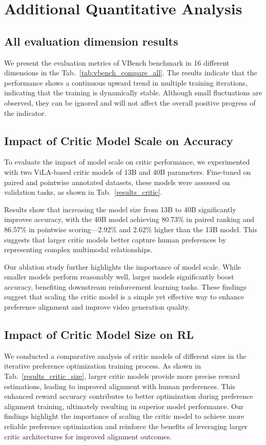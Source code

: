 \section{Additional Quantitative Analysis}
\subsection{All evaluation dimension results}
We present the evaluation metrics of VBench benchmark in 16 different dimensions in the Tab.~\ref{tab:vbench_compare_all}. The results indicate that the performance shows a continuous upward trend in multiple training iterations, indicating that the training is dynamically stable. Although small fluctuations are observed, they can be ignored and will not affect the overall positive progress of the indicator.



\subsection{Impact of Critic Model Scale on Accuracy}
To evaluate the impact of model scale on critic performance, we experimented with two ViLA-based critic models of 13B and 40B parameters. Fine-tuned on paired and pointwise annotated datasets, these models were assessed on validation tasks, as shown in Tab.~\ref{results_critic}.  

Results show that increasing the model size from 13B to 40B significantly improves accuracy, with the 40B model achieving 80.73\% in paired ranking and 86.57\% in pointwise scoring—2.92\% and 2.62\% higher than the 13B model. This suggests that larger critic models better capture human preferences by representing complex multimodal relationships.  

Our ablation study further highlights the importance of model scale. While smaller models perform reasonably well, larger models significantly boost accuracy, benefiting downstream reinforcement learning tasks. These findings suggest that scaling the critic model is a simple yet effective way to enhance preference alignment and improve video generation quality.


\subsection{Impact of Critic Model Size on RL}
We conducted a comparative analysis of critic models of different sizes in the iterative preference optimization training process. As shown in Tab.~\ref{results_critic_size}, larger critic models provide more precise reward estimations, leading to improved alignment with human preferences. This enhanced reward accuracy contributes to better optimization during preference alignment training, ultimately resulting in superior model performance. Our findings highlight the importance of scaling the critic model to achieve more reliable preference optimization and reinforce the benefits of leveraging larger critic architectures for improved alignment outcomes.

